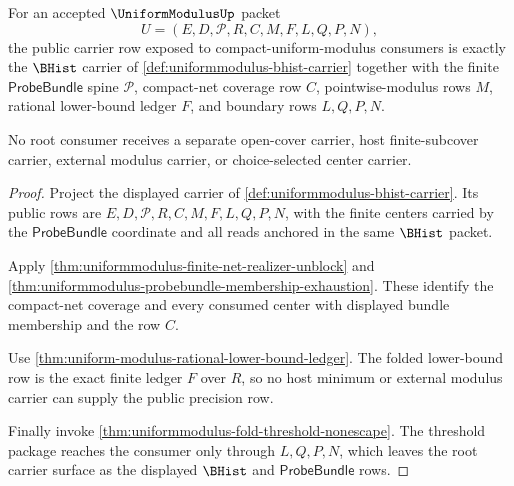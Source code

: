 \begin{theorem}
\label{thm:uniformmodulus-root-carrier-public-row}
For an accepted $\UniformModulusUp$ packet
$$
U=(E,D,\mathcal{P},R,C,M,F,L,Q,P,N),
$$
the public carrier row exposed to compact-uniform-modulus consumers is exactly the $\BHist$ carrier of \autoref{def:uniformmodulus-bhist-carrier} together with the finite $\mathsf{ProbeBundle}$ spine $\mathcal{P}$, compact-net coverage row $C$, pointwise-modulus rows $M$, rational lower-bound ledger $F$, and boundary rows $L,Q,P,N$.

No root consumer receives a separate open-cover carrier, host finite-subcover carrier, external modulus carrier, or choice-selected center carrier.
\end{theorem}
\begin{proof}
Project the displayed carrier of \autoref{def:uniformmodulus-bhist-carrier}. Its public rows are $E,D,\mathcal{P},R,C,M,F,L,Q,P,N$, with the finite centers carried by the $\mathsf{ProbeBundle}$ coordinate and all reads anchored in the same $\BHist$ packet.

Apply \autoref{thm:uniformmodulus-finite-net-realizer-unblock} and \autoref{thm:uniformmodulus-probebundle-membership-exhaustion}. These identify the compact-net coverage and every consumed center with displayed bundle membership and the row $C$.

Use \autoref{thm:uniform-modulus-rational-lower-bound-ledger}. The folded lower-bound row is the exact finite ledger $F$ over $R$, so no host minimum or external modulus carrier can supply the public precision row.

Finally invoke \autoref{thm:uniformmodulus-fold-threshold-nonescape}. The threshold package reaches the consumer only through $L,Q,P,N$, which leaves the root carrier surface as the displayed $\BHist$ and $\mathsf{ProbeBundle}$ rows.
\end{proof}


